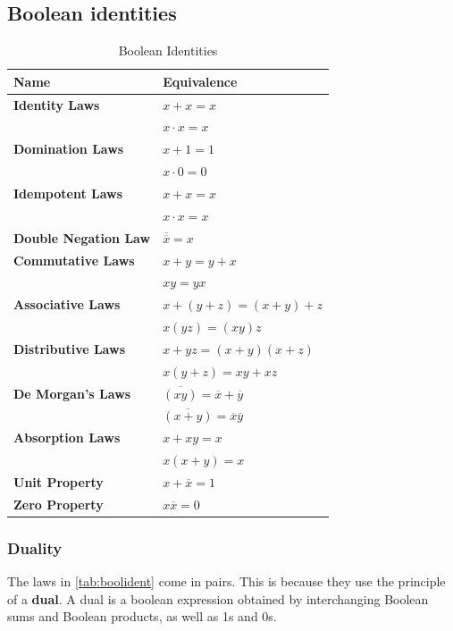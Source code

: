 	\subsection{Boolean identities}
	\begin{table}[H]
		\centering
		\caption{Boolean Identities}\label{tab:boolident}
		\def\arraystretch{1.4}
		\begin{tabular}{p{}p{}}
		\toprule
		Name  & Equivalence \\ \midrule
	
		\textbf{Identity Laws} & \(x + x = x\) \\
		\textbf{} & \(x \cdot x = x\) \\\midrule
		\textbf{Domination Laws} & \(x + 1 = 1\) \\
		\textbf{} &  \(x \cdot 0 = 0\) \\\midrule
		\textbf{Idempotent Laws} & \( x + x = x\) \\
		\textbf{} &  \(x \cdot x = x\)  \\\midrule
		\textbf{Double Negation Law} & \(\overline{\overline{x}}=x\) \\\midrule
		\textbf{Commutative Laws} & \( x + y = y + x \) \\
		\textbf{} & \(xy = yx\) \\\midrule
		\textbf{Associative Laws} & \( x + (y + z) = (x + y) + z\) \\
		\textbf{} & \( x(yz) = (xy)z \)  \\\midrule
		\textbf{Distributive Laws} & \(x + yz = (x+y)(x+z)\) \\
		\textbf{} & \(x(y + z) = xy + xz\) \\ \midrule
		\textbf{De Morgan's Laws} & \(\overline{(xy)}= \overline{x}+ \overline{y}\) \\
		\textbf{} & \(\overline{(x+y)}= \overline{x} \overline{y}\) \\\midrule
		\textbf{Absorption Laws} & \(x + xy = x\) \\
		\textbf{} & \(x(x + y) = x\) \\\midrule
		\textbf{Unit Property} & \(x + \overline{x} = 1\) \\\midrule
		\textbf{Zero Property} & \(x \overline{x} = 0\) \\ \bottomrule
		\end{tabular}
		\end{table}
		\subsubsection{Duality}
		The laws in \autoref{tab:boolident} come in pairs. This is because they use the principle of a \textbf{dual}. A dual is a boolean expression obtained by interchanging Boolean sums and Boolean products, as well as 1s and 0s.

